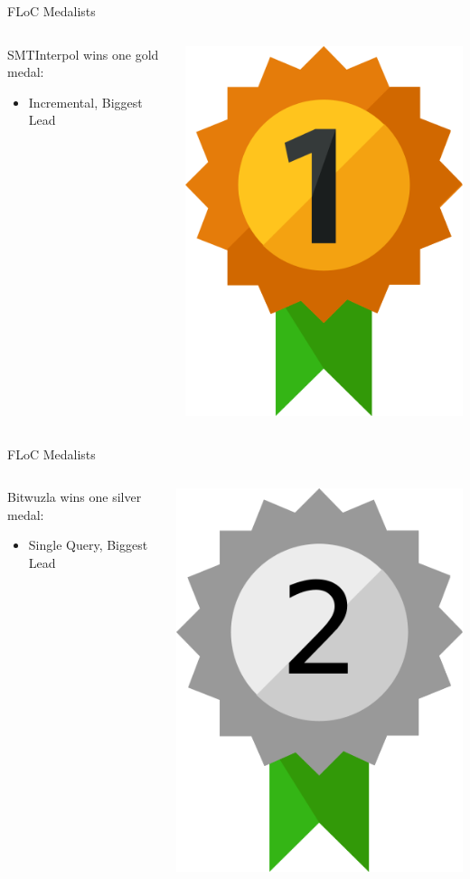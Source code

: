 \documentclass[table]{beamer}
\newcommand\vitem{\vfill\item}
\begin{document}
\begin{frame}{FLoC Medalists}

  \begin{columns}
    \begin{column}{0.6\textwidth}

  \Large SMTInterpol wins one gold medal:
  \begin{itemize}
    \bigskip
    \vitem Incremental, Biggest Lead
  \end{itemize}
\end{column}
\hfill
\begin{column}{0.4\textwidth}
  \begin{center}
    \includegraphics[width=.3\textwidth]{medalgold}
  \end{center}
\end{column}
\end{columns}

\end{frame}

\begin{frame}{FLoC Medalists}

  \begin{columns}
    \begin{column}{0.6\textwidth}

  \Large Bitwuzla wins one silver medal:
  \begin{itemize}
    \bigskip
    \vitem Single Query, Biggest Lead
  \end{itemize}
\end{column}
\hfill
\begin{column}{0.4\textwidth}
  \begin{center}
    \includegraphics[width=.3\textwidth]{medalsilver}
  \end{center}
\end{column}
\end{columns}

\end{frame}
\end{document}
